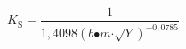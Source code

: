 \[K_{\mathrm{S}}\mathrm{=}\frac{\mathrm{1}}{\mathrm{1,4098}{\left(b\mathrm{\bullet }m\mathrm{\cdot }\sqrt{Y}\right)}^{\mathrm{-}\mathrm{0,0785}}}\]